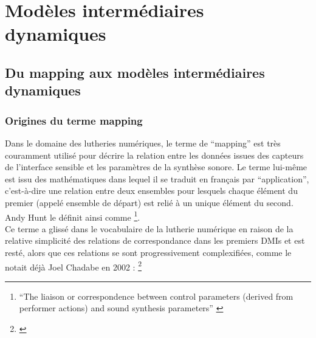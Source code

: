\section{Modèles intermédiaires dynamiques}
\label{sec:algorithms:MID}

\subsection{Du mapping aux modèles intermédiaires dynamiques}
\label{sec:algorithms:MID:mapping-to-MID}

\subsubsection{Origines du terme mapping} 

\noindent Dans le domaine des lutheries numériques, le terme de ``mapping'' est très couramment utilisé pour décrire la relation entre les données issues des capteurs de l'interface sensible et les paramètres de la synthèse sonore. Le terme lui-même est issu des mathématiques dans lequel il se traduit en français par ``application'', c'est-à-dire une relation entre deux ensembles pour lesquels chaque élément du premier (appelé ensemble de départ) est relié à un unique élément du second. Andy Hunt le définit ainsi comme \footnote{``The liaison or correspondence between control parameters (derived from performer actions) and sound synthesis parameters'' \cite{hunt_towards_2000}}.\\
\indent Ce terme a glissé dans le vocabulaire de la lutherie numérique en raison de la relative simplicité des relations de correspondance dans les premiers \glspl{DMI} et est resté, alors que ces relations se sont progressivement complexifiées, comme le notait déjà Joel Chadabe en 2002 : \footnote{ \cite{chadabe_limitations_2002}}

